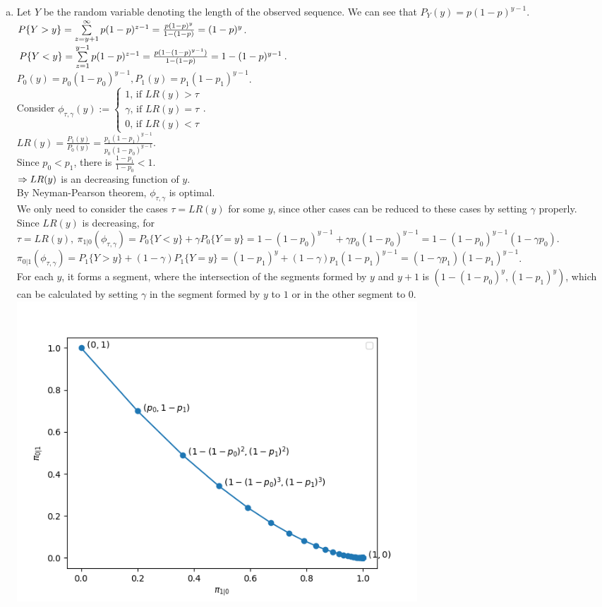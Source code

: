 \begin{pr}
\begin{enumerate}[(a)]
\item Let $Y$ be the random variable denoting the length of the observed sequence. We can see that $P_Y(y)=p(1-p)^{y-1}$.\\
$P\{Y>y\}=\sum\limits_{z=y+1}^\infty p(1-p)^{z-1}=\frac{p(1-p)^y}{1-(1-p)}=(1-p)^y$.\\
$P\{Y<y\}=\sum\limits_{z=1}^{y-1}p(1-p)^{z-1}=\frac{p(1-(1-p)^{y-1})}{1-(1-p)}=1-(1-p)^{y-1}$.\\
$P_0(y)=p_0(1-p_0)^{y-1}, P_1(y)=p_1(1-p_1)^{y-1}$.\\
Consider $\phi_{\tau, \gamma}(y):=\begin{cases}
1\text{, if }LR(y)>\tau\\
\gamma\text{, if }LR(y)=\tau\\
0\text{, if }LR(y)<\tau
\end{cases}$.\\
$LR(y)=\frac{P_1(y)}{P_0(y)}=\frac{p_1(1-p_1)^{y-1}}{p_0(1-p_0)^{y-1}}$.\\
Since $p_0<p_1$, there is $\frac{1-p_1}{1-p_0}<1$.\\
$\Rightarrow LR(y)$ is an decreasing function of $y$.\\
By Neyman-Pearson theorem, $\phi_{\tau, \gamma}$ is optimal.\\
We only need to consider the cases $\tau=LR(y)$ for some $y$, since other cases can be reduced to these cases by setting $\gamma$ properly.\\
Since $LR(y)$ is decreasing, for $\tau=LR(y),\ \pi_{1|0}(\phi_{\tau, \gamma})=P_0\{Y<y\}+\gamma P_0\{Y=y\}=1-(1-p_0)^{y-1}+\gamma p_0(1-p_0)^{y-1}=1-(1-p_0)^{y-1}(1-\gamma p_0)$.\\
$\pi_{0|1}(\phi_{\tau, \gamma})=P_1\{Y>y\}+(1-\gamma)P_1\{Y=y\}=(1-p_1)^y+(1-\gamma)p_1(1-p_1)^{y-1}=(1-\gamma p_1)(1-p_1)^{y-1}$.\\
For each $y$, it forms a segment, where the intersection of the segments formed by $y$ and $y+1$ is $(1-(1-p_0)^y, (1-p_1)^y)$, which can be calculated by setting $\gamma$ in the segment formed by $y$ to $1$ or in the other segment to $0$.\\
\includegraphics[width=15cm]{1b.png}

\end{enumerate}
\end{pr}
